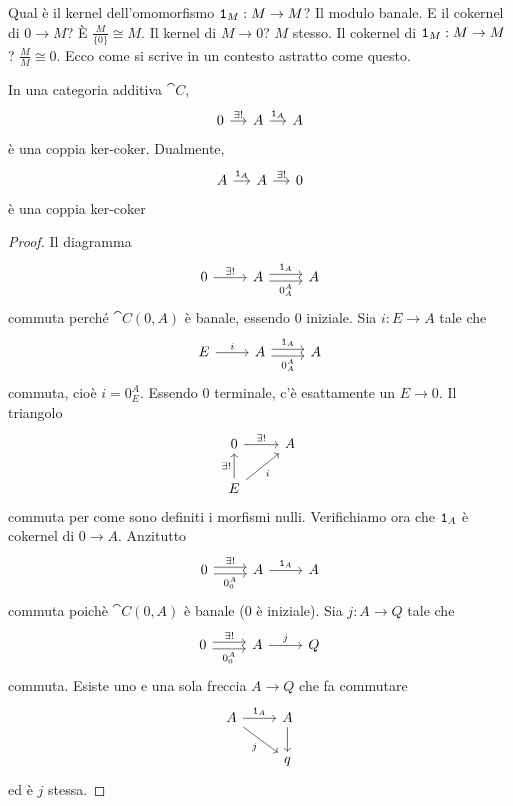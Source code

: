 Qual è il kernel dell'omomorfismo \(\mathtt 1_M : M \to M\)? Il modulo banale. E
il cokernel di \(0 \to M\)? È \(\frac{M}{\{0\}} \cong M\). Il kernel di
\(M \to 0\)? \(M\) stesso. Il cokernel di \(\mathtt 1_M : M \to M\)?
\(\frac{M}{M} \cong 0\). Ecco come si scrive in un contesto astratto come
questo.

\begin{lemma}\label{lemma:KerCokerId}
  In una categoria additiva \(\cat C \),
  \[
    \begin{tikzcd}[column sep=small]
      0 \ar["{\exists!}", r] & A \ar["{\id_A}", r] & A
    \end{tikzcd}
  \]
  è una coppia ker-coker. Dualmente,
  \[
    \begin{tikzcd}[column sep=small]
      A \ar["{\id_A}", r] & A \ar["{\exists!}", r] & 0
    \end{tikzcd}
  \]
  è una coppia ker-coker
\end{lemma}

\begin{proof}
  Il diagramma
  \[
    \begin{tikzcd}
      0 \ar["{\exists!}", r] & A \ar["{\id_A}", r, shift left] \ar["{0_A^A}",
      r, shift right, swap] & A
    \end{tikzcd}
  \]
  commuta perché \(\cat C(0,A)\) è banale, essendo \(0\) iniziale. Sia
  \(i : E \to A\) tale che
  \[
    \begin{tikzcd}
      E \ar["{i}", r] & A \ar["{\id_A}", r, shift left] \ar["{0_A^A}",
      r, shift right, swap] & A
    \end{tikzcd}
  \]
  commuta, cioè \(i = 0_E^A \). Essendo 0 terminale, c'è esattamente un
  \(E \to 0\). Il triangolo
  \[
    \begin{tikzcd}
      0 \ar["{\exists!}", r] & A \\
      E \ar["{\exists!}", u] \ar["i", ur, swap]
    \end{tikzcd}
  \]
  commuta per come sono definiti i morfismi nulli.  Verifichiamo ora che
  \(\mathtt 1_A\) è cokernel di \(0 \to A\). Anzitutto
  \[
    \begin{tikzcd}
      0 \ar["{\exists!}", r, shift left] \ar["{0_0^A}", r, shift right,
      swap] & A \ar["{\id_A}", r] & A
    \end{tikzcd}
  \]
  commuta poichè \(\cat C(0,A)\) è banale (\(0\) è iniziale). Sia
  \(j:A \to Q\) tale che
  \[
    \begin{tikzcd}
      0 \ar["{\exists!}", r, shift left] \ar["{0_0^A}", r, shift right,
      swap] & A \ar["{j}", r] & Q
    \end{tikzcd}
  \]
  commuta. Esiste uno e una sola freccia \(A \to Q\) che fa commutare
  \[
    \begin{tikzcd}
      A \ar["{\id_A}", r] \ar["j", dr, swap] & A \ar[d] \\
      & q
    \end{tikzcd}
  \]
  ed è \(j\) stessa.
\end{proof}

